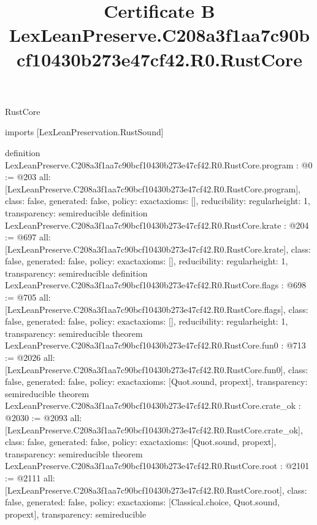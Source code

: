 \begin{lexlean}{RustCore}
\title{Certificate B LexLeanPreserve.C208a3f1aa7c90bcf10430b273e47cf42.R0.RustCore}
\begin{coremodule}
imports [LexLeanPreservation.RustSound]

definition LexLeanPreserve.C208a3f1aa7c90bcf10430b273e47cf42.R0.RustCore.program : @0 := @203 {
  all: [LexLeanPreserve.C208a3f1aa7c90bcf10430b273e47cf42.R0.RustCore.program],
  class: false,
  generated: false,
  policy: exact{axioms: []},
  reducibility: regular{height: 1},
  transparency: semireducible
}
definition LexLeanPreserve.C208a3f1aa7c90bcf10430b273e47cf42.R0.RustCore.krate : @204 := @697 {
  all: [LexLeanPreserve.C208a3f1aa7c90bcf10430b273e47cf42.R0.RustCore.krate],
  class: false,
  generated: false,
  policy: exact{axioms: []},
  reducibility: regular{height: 1},
  transparency: semireducible
}
definition LexLeanPreserve.C208a3f1aa7c90bcf10430b273e47cf42.R0.RustCore.flags : @698 := @705 {
  all: [LexLeanPreserve.C208a3f1aa7c90bcf10430b273e47cf42.R0.RustCore.flags],
  class: false,
  generated: false,
  policy: exact{axioms: []},
  reducibility: regular{height: 1},
  transparency: semireducible
}
theorem LexLeanPreserve.C208a3f1aa7c90bcf10430b273e47cf42.R0.RustCore.fun0 : @713 := @2026 {
  all: [LexLeanPreserve.C208a3f1aa7c90bcf10430b273e47cf42.R0.RustCore.fun0],
  class: false,
  generated: false,
  policy: exact{axioms: [Quot.sound, propext]},
  transparency: semireducible
}
theorem LexLeanPreserve.C208a3f1aa7c90bcf10430b273e47cf42.R0.RustCore.crate_ok : @2030 := @2093 {
  all: [LexLeanPreserve.C208a3f1aa7c90bcf10430b273e47cf42.R0.RustCore.crate_ok],
  class: false,
  generated: false,
  policy: exact{axioms: [Quot.sound, propext]},
  transparency: semireducible
}
theorem LexLeanPreserve.C208a3f1aa7c90bcf10430b273e47cf42.R0.RustCore.root : @2101 := @2111 {
  all: [LexLeanPreserve.C208a3f1aa7c90bcf10430b273e47cf42.R0.RustCore.root],
  class: false,
  generated: false,
  policy: exact{axioms: [Classical.choice, Quot.sound, propext]},
  transparency: semireducible
}


\end{coremodule}
\end{lexlean}
